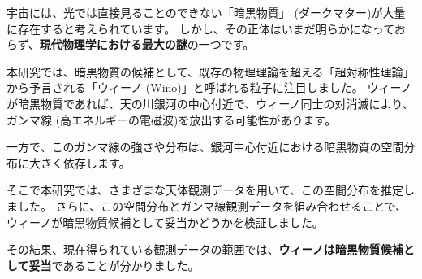 宇宙には、光では直接見ることのできない「暗黒物質」 (ダークマター)が大量に存在すると考えられています。
しかし、その正体はいまだ明らかになっておらず、\textbf{現代物理学における最大の謎}の一つです。

本研究では、暗黒物質の候補として、既存の物理理論を超える「超対称性理論」から予言される「ウィーノ (Wino)」と呼ばれる粒子に注目しました。
ウィーノが暗黒物質であれば、天の川銀河の中心付近で、ウィーノ同士の対消滅により、ガンマ線 (高エネルギーの電磁波)を放出する可能性があります。

一方で、このガンマ線の強さや分布は、銀河中心付近における暗黒物質の空間分布に大きく依存します。

そこで本研究では、さまざまな天体観測データを用いて、この空間分布を推定しました。
さらに、この空間分布とガンマ線観測データを組み合わせることで、ウィーノが暗黒物質候補として妥当かどうかを検証しました。

その結果、現在得られている観測データの範囲では、\textbf{ウィーノは暗黒物質候補として妥当}であることが分かりました。
